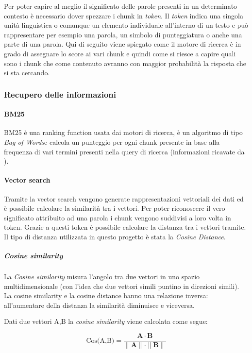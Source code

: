 \noindent Per poter capire al meglio il significato delle parole presenti in un determinato contesto è necessario dover spezzare i chunk in \emph{token}.
Il \emph{token} indica una singola unità linguistica o comunque un elemento individuale all'interno di un testo e può rappresentare per esempio una parola, un simbolo di punteggiatura o anche una parte di una parola.
Qui di seguito viene spiegato come il motore di ricerca è in grado di assegnare lo score ai vari chunk e quindi come si riesce a capire quali sono i chunk che come contenuto avranno con maggior probabilità la risposta che si sta cercando.

\subsubsection{Recupero delle informazioni}
\label{subsubsec:rec-inf}
\paragraph{\gls{BM25}}
BM25 è una ranking function usata dai motori di ricerca, è un algoritmo di tipo \emph{\gls{Bag-of-Words}}\glsfirstoccur e calcola un punteggio per ogni chunk
presente in base alla frequenza di vari termini presenti nella query di ricerca (informazioni ricavate da \cite{site:wikiOkapi}). 

\paragraph{Vector search}
Tramite la vector search vengono generate rappresentazioni vettoriali dei dati ed è possibile calcolare la similarità tra i vettori.
Per poter riconoscere il vero significato attribuito ad una parola i chunk vengono suddivisi a loro volta in token.
Grazie a questi token è possibile calcolare la distanza tra i vettori tramite.
Il tipo di distanza utilizzata in questo progetto è stata la \emph{Cosine Distance}.

\subparagraph{Cosine similarity}
La \emph{Cosine similarity} misura l'angolo tra due vettori in uno spazio multidimensionale (con l'idea che due vettori simili puntino in direzioni simili).
La cosine similarity e la cosine distance hanno una relazione inversa: all'aumentare della distanza la similarità diminuisce e viceversa.

\noindent Dati due vettori A,B la \emph{cosine similarity} viene calcolata come segue:

\[
\text{Cos(A,B)} = \frac{{\mathbf{A} \cdot \mathbf{B}}}{{\|\mathbf{A}\| \cdot \|\mathbf{B}\|}}    
\]

